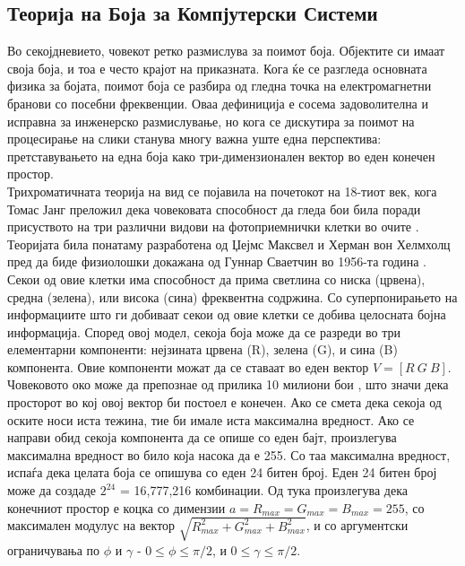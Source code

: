 \documentclass[12pt]{article}
\begin{document}
  \subsection{Теорија на Боја за Компјутерски Системи}
    \label{sec:colour_theory}
    Во секојдневието, човекот ретко размислува за поимот боја. Објектите си имаат своја боја, и тоа е често крајот на приказната. Кога ќе се разгледа основната физика за бојата, поимот боја се разбира од гледна точка на електромагнетни бранови со посебни фреквенции. Оваа дефиниција е сосема задоволителна и исправна за инженерско размислување, но кога се дискутира за поимот на процесирање на слики станува многу важна уште една перспектива: претставувањето на една боја како три-димензионален вектор во еден конечен простор.
    \\
    Трихроматичната теорија на вид се појавила на почетокот на 18-тиот век, кога Томас Јанг преложил дека човековата способност да гледа бои била поради присуството на три различни видови на фотоприемнички клетки во очите \cite{young}. Теоријата била понатаму разработена од Џејмс Максвел и Херман вон Хелмхолц пред да биде физиолошки докажана од Гуннар Сваетчин во 1956-та година \cite{svaetchin}.
    \bigbreak
    Секои од овие клетки има способност да прима светлина со ниска (црвена), средна (зелена), или висока (сина) фреквентна содржина. Со суперпонирањето на информациите што ги добиваат секои од овие клетки се добива целосната бојна информација. Според овој модел, секоја боја може да се разреди во три елементарни компоненти: нејзината црвена (R), зелена (G), и сина (B) компонента. Овие компоненти можат да се ставаат во еден вектор $ V = [R\ G\ B]$. Човековото око може да препознае од прилика 10 милиони бои \cite{nColours}, што значи дека просторот во кој овој вектор би постоел е конечен. Ако се смета дека секоја од оските носи иста тежина, тие би имале иста максимална вредност. Ако се направи обид секоја компонента да се опише со еден бајт, произлегува максимална вредност во било која насока да е 255. Со таа максимална вредност, испаѓа дека целата боја се опишува со еден 24 битен број. Еден 24 битен број може да создаде $2^{24}$ = 16,777,216 комбинации. Од тука произлегува дека конечниот простор е коцка со димензии $a = R_{max} = G_{max} = B_{max} = 255 $, со максимален модулус на вектор $\sqrt{R_{max}^2 + G_{max}^2 + B_{max}^2}$, и со аргументски ограничувања по $\phi$ и $\gamma$ - $0 \leq \phi \leq \pi /2$, и $0 \leq \gamma \leq \pi /2$.
    \bigbreak
\end{document}
